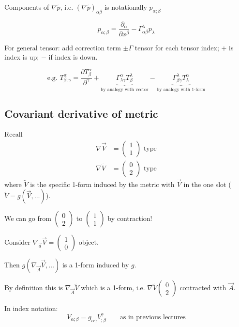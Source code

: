 \documentclass[a4paper]{article} %
\newcommand{\pmx}[1]{
\begin{pmatrix}
#1
\end{pmatrix}
}
\renewcommand{\tilde}{\widetilde}
\begin{document}
Components of $\nabla\tilde{p}$, i.e. $(\nabla\tilde{p})_{\alpha\beta}$ is notationally $p_{\alpha;\beta}$

\begin{equation}
p_{\alpha;\beta}=\frac{\partial_{\alpha}}{\partial x^{\beta}}-\Gamma^{\lambda}_{\alpha\beta} p_{\lambda}
\end{equation}

For general tensor: add correction term $\pm \Gamma$ tensor for each tensor index; $+$ is index is up; $-$ if index is down.

\begin{equation}
\text{e.g. } T^{\alpha}_{\beta;\gamma}=\frac{\partial T^{\alpha}_{\beta}}{\partial^{\gamma}}
+\underbrace{\Gamma^{\alpha}_{\lambda\gamma} T^{\lambda}_{\beta}}_{\text{by analogy with vector}}
-\underbrace{\Gamma^{\lambda}_{\beta \gamma}T^{\alpha}_{\lambda}}_{\text{by analogy with 1-form}}
\end{equation}

\subsection{Covariant derivative of metric}

Recall
\begin{align}
\nabla \vec{V}&=\pmx{1\\1}\text{ type}\\
\nabla \tilde{V}&=\pmx{0\\2}\text{ type}
\end{align}
where $\tilde{V}$ is the specific 1-form induced by the metric with $\vec{V}$ in the one slot ($\tilde{V}=g(\vec{V},\ldots)$).

We can go from $\pmx{0\\2}$ to $\pmx{1\\1}$ by contraction! 

Consider $\nabla_{\vec{a}}\vec{V}=\pmx{1\\0}$ object. 

Then $g(\nabla_{\vec{A}}\vec{V},\ldots)$ is a 1-form induced by $g$. 

By definition this is $\nabla_{\vec{A}}\tilde{V}$ which is a 1-form, i.e. $\nabla\tilde{V}\pmx{0\\2}$ contracted with $\vec{A}$. 

In index notation:
\begin{equation}
V_{\alpha;\beta}=g_{\alpha\gamma}V^{\gamma}_{;\beta}\qquad\text{as in previous lectures}
\end{equation}
\end{document}
